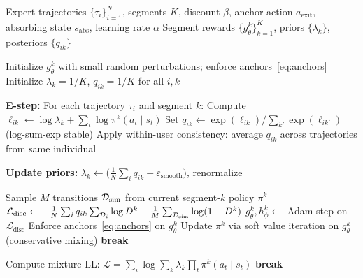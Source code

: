 \documentclass[11pt]{article}
\newcommand{\calL}{\mathcal{L}}
\begin{document}
\begin{algorithm}[h!]
\caption{EM-AIRL: Anchored AIRL with Latent Heterogeneity \citep{lee2026}}
\label{alg:aairl}
\begin{algorithmic}[1]
\REQUIRE Expert trajectories $\{\tau_i\}_{i=1}^N$, segments $K$, discount $\beta$,
  anchor action $a_{\text{exit}}$, absorbing state $s_{\text{abs}}$, learning rate $\alpha$
\ENSURE Segment rewards $\{g_\theta^k\}_{k=1}^K$, priors $\{\lambda_k\}$, posteriors $\{q_{ik}\}$

\STATE Initialize $g_\theta^k$ with small random perturbations; enforce anchors~\eqref{eq:anchors}
\STATE Initialize $\lambda_k = 1/K$,\; $q_{ik} = 1/K$ for all $i, k$


  \STATE \textbf{E-step:} For each trajectory $\tau_i$ and segment $k$:
  \STATE \quad Compute $\ell_{ik} \leftarrow \log \lambda_k + \sum_t \log \pi^k(a_t \mid s_t)$
  \STATE \quad Set $q_{ik} \leftarrow \exp(\ell_{ik}) / \sum_{k'} \exp(\ell_{ik'})$ \quad (log-sum-exp stable)
  \STATE \quad Apply within-user consistency: average $q_{ik}$ across trajectories from same individual

  \STATE \textbf{Update priors:} $\lambda_k \leftarrow \bigl(\tfrac{1}{N}\sum_i q_{ik} + \varepsilon_{\text{smooth}}\bigr)$, renormalize

      \STATE Sample $M$ transitions $\mathcal{D}_{\text{sim}}$ from current segment-$k$ policy $\pi^k$
        \STATE $\calL_{\text{disc}} \leftarrow -\frac{1}{N}\sum_i q_{ik} \sum_{\calD_i}\log D^k - \frac{1}{M}\sum_{\calD_{\text{sim}}}\log(1-D^k)$
        \STATE $g_\theta^k, h_\phi^k \leftarrow$ Adam step on $\calL_{\text{disc}}$
        \STATE Enforce anchors~\eqref{eq:anchors} on $g_\theta^k$
      \ENDFOR
      \STATE Update $\pi^k$ via soft value iteration on $g_\theta^k$ (conservative mixing)
       \textbf{break} \ENDIF
    \ENDFOR
  \ENDFOR

  \STATE Compute mixture LL: $\calL = \sum_i \log \sum_k \lambda_k \prod_t \pi^k(a_t \mid s_t)$
  \IF{$|\Delta \calL| / |\calL| < \varepsilon_{\text{EM}}$} \textbf{break} \ENDIF

\ENDFOR
\end{algorithmic}
\end{algorithm}
\FloatBarrier
\end{document}
